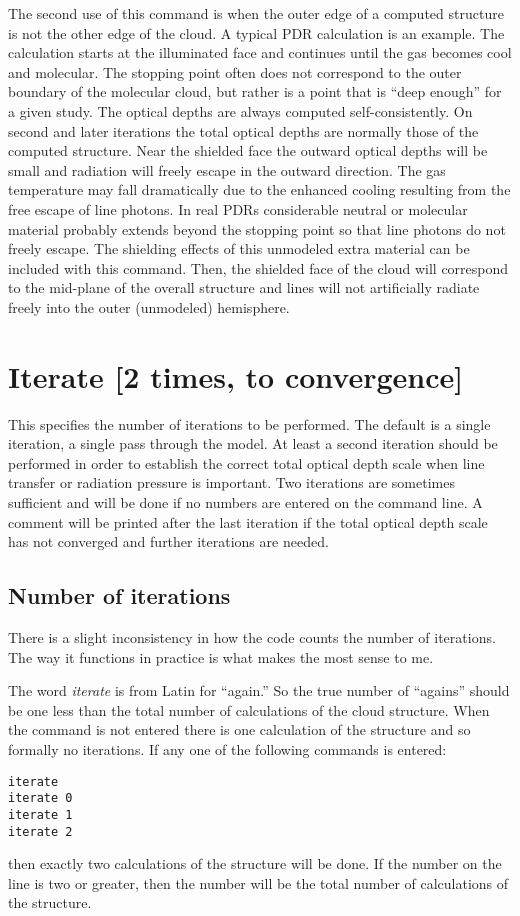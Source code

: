 The second use of this command is when the outer edge of a computed
structure is not the other edge of the cloud.
A typical PDR calculation
is an example.
The calculation starts at the illuminated face and continues
until the gas becomes cool and molecular.  The stopping point often does
not correspond to the outer boundary of the molecular cloud, but rather
is a point that is ``deep enough'' for a given study.  The optical depths
are always computed self-consistently.  On second and later iterations the
total optical depths are normally those of the computed structure.  Near
the shielded face the outward optical depths will be small and radiation
will freely escape in the outward direction.  The gas temperature may fall
dramatically due to the enhanced cooling resulting from the free escape
of line photons.
In real PDRs considerable neutral or molecular material
probably extends beyond the stopping point so that line photons do not freely escape.
The shielding effects of this unmodeled extra material can be
included with this command.
Then, the shielded face of the cloud will
correspond to the mid-plane of the overall structure and lines will not
artificially radiate freely into the outer (unmodeled) hemisphere.

\section{Iterate [2 times, to convergence]}
\label{sec:IterateCommand}

This specifies the number of iterations to be performed.
The default
is a single iteration, a single pass through the model.
At least a second
iteration should be performed in order to establish the correct total optical
depth scale when line transfer or radiation pressure is important.
Two
iterations are sometimes sufficient and will be done if no numbers are
entered on the command line.
A comment will be printed after the last
iteration if the total optical depth scale has not converged and further
iterations are needed.

\subsection{Number of iterations}

There is a slight inconsistency in how the code counts the number of
iterations.
The way it functions in practice is what makes the most sense
to me.

The word \emph{iterate} is from Latin for ``again.''
So the true number of
``agains'' should be one less than the total number of calculations of the
cloud structure.
When the  command is not entered there is one
calculation of the structure and so formally no iterations.
 If any one
of the following commands is entered:
\begin{verbatim}
iterate
iterate 0
iterate 1
iterate 2
\end{verbatim}
then exactly two calculations of the structure will be done.
If the number
on the line is two or greater, then the number will be the total number
of calculations of the structure.

